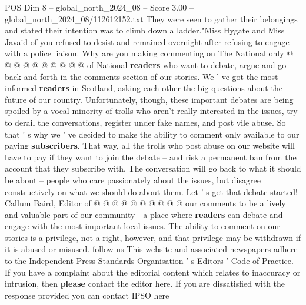 \begin{textsample}{POS Dim 8 – global\_north\_2024\_08 – Score 3.00 – global\_north\_2024\_08/112612152.txt}
They were seen to gather their belongings and stated their intention was to climb down a ladder."Miss Hygate and Miss Javaid of you refused to desist and remained overnight after refusing to engage with a police liaison.
Why are you making commenting on The National only @ @ @ @ @ @ @ @ @ @ of National \textbf{readers} who want to debate, argue and go back and forth in the comments section of our stories.
We ' ve got the most informed \textbf{readers} in Scotland, asking each other the big questions about the future of our country.
Unfortunately, though, these important debates are being spoiled by a vocal minority of trolls who aren't really interested in the issues, try to derail the conversations, register under fake names, and post vile abuse.
So that ' s why we ' ve decided to make the ability to comment only available to our paying \textbf{subscribers}.
That way, all the trolls who post abuse on our website will have to pay if they want to join the debate -- and risk a permanent ban from the account that they subscribe with.
The conversation will go back to what it should be about -- people who care passionately about the issues, but disagree constructively on what we should do about them.
Let ' s get that debate started!
Callum Baird, Editor of @ @ @ @ @ @ @ @ @ @ our comments to be a lively and valuable part of our community - a place where \textbf{readers} can debate and engage with the most important local issues.
The ability to comment on our stories is a privilege, not a right, however, and that privilege may be withdrawn if it is abused or misused. follow us This website and associated newspapers adhere to the Independent Press Standards Organisation ' s Editors ' Code of Practice.
If you have a complaint about the editorial content which relates to inaccuracy or intrusion, then \textbf{please} contact the editor here.
If you are dissatisfied with the response provided you can contact IPSO here

\end{textsample}
